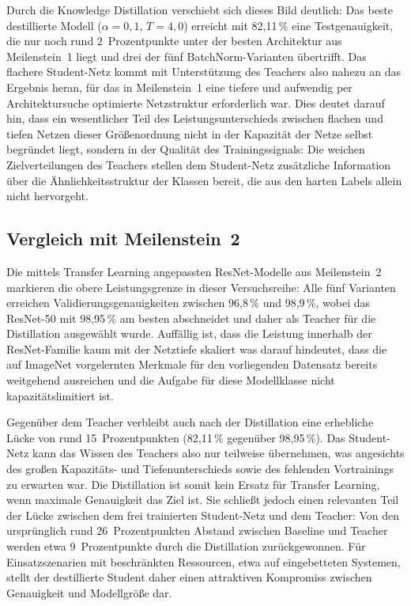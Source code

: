 Durch die Knowledge Distillation verschiebt sich dieses Bild deutlich: Das beste destillierte Modell
($\alpha = 0{,}1$, $T = 4{,}0$) erreicht mit 82{,}11\,\% eine Testgenauigkeit, die nur noch rund 2~Prozentpunkte
unter der besten Architektur aus Meilenstein~1 liegt und drei der fünf BatchNorm-Varianten übertrifft. Das flachere
Student-Netz kommt mit Unterstützung des Teachers also nahezu an das Ergebnis heran, für das in Meilenstein~1 eine
tiefere und aufwendig per Architektursuche optimierte Netzstruktur erforderlich war. Dies deutet darauf hin, dass ein
wesentlicher Teil des Leistungsunterschieds zwischen flachen und tiefen Netzen dieser Größenordnung nicht in der
Kapazität der Netze selbst begründet liegt, sondern in der Qualität des Trainingssignals: Die weichen Zielverteilungen
des Teachers stellen dem Student-Netz zusätzliche Information über die Ähnlichkeitsstruktur der Klassen bereit, die aus
den harten Labels allein nicht hervorgeht.
 
\subsection{Vergleich mit Meilenstein~2}
\label{sec:diskussion_m2}
 
Die mittels Transfer Learning angepassten ResNet-Modelle aus Meilenstein~2 markieren die obere Leistungsgrenze in dieser
Versuchsreihe: Alle fünf Varianten erreichen Validierungsgenauigkeiten zwischen 96{,}8\,\% und 98{,}9\,\%, wobei das
ResNet-50 mit 98{,}95\,\% am besten abschneidet und daher als Teacher für die Distillation ausgewählt wurde. Auffällig
ist, dass die Leistung innerhalb der ResNet-Familie kaum mit der Netztiefe skaliert was darauf hindeutet, dass die auf ImageNet
vorgelernten Merkmale für den vorliegenden Datensatz bereits weitgehend ausreichen und die Aufgabe für diese Modellklasse nicht
kapazitätslimitiert ist.
 
Gegenüber dem Teacher verbleibt auch nach der Distillation eine erhebliche Lücke von rund 15~Prozentpunkten
(82{,}11\,\% gegenüber 98{,}95\,\%). Das Student-Netz kann das Wissen des Teachers also nur teilweise übernehmen,
was angesichts des großen Kapazitäts- und Tiefenunterschieds sowie des fehlenden Vortrainings zu erwarten war. Die
Distillation ist somit kein Ersatz für Transfer Learning, wenn maximale Genauigkeit das Ziel ist. Sie schließt jedoch
einen relevanten Teil der Lücke zwischen dem frei trainierten Student-Netz und dem Teacher: Von den ursprünglich rund
26~Prozentpunkten Abstand zwischen Baseline und Teacher werden etwa 9~Prozentpunkte durch die Distillation
zurückgewonnen. Für Einsatzszenarien mit beschränkten Ressourcen, etwa auf eingebetteten Systemen, stellt der destillierte Student
daher einen attraktiven Kompromiss zwischen Genauigkeit und Modellgröße dar.
 
